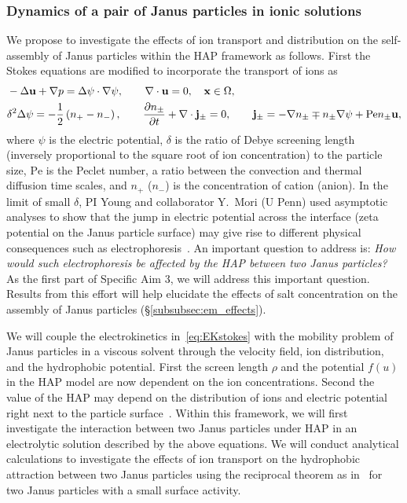 \subsubsection{Dynamics of a pair of Janus particles in ionic
solutions\label{subsubsec:JP_electrolyte}}
We propose to investigate the effects of ion transport and distribution
on the self-assembly of Janus particles within the HAP framework as
follows. First the Stokes equations are modified to incorporate the
transport of ions as
\begin{equation}
\label{eq:EKstokes}
\begin{aligned}
  &-\Delta \mathbf{u} + \nabla p = \Delta\psi\cdot\nabla\psi, \qquad
  \nabla \cdot \mathbf{u} = 0,  \quad \mathbf{x} \in \Omega,\\
  &\delta^2\Delta\psi = -\frac{1}{2}\left(n_+-n_-\right),\qquad
  \frac{\partial n_{\pm}}{\partial t} + \nabla\cdot{\bf j}_{\pm} = 0,\qquad {\bf j}_{\pm} = -\nabla n_{\pm} \mp n_{\pm} \nabla\psi + \mbox{Pe} n_{\pm}\mathbf{u},
\end{aligned}
\end{equation}
where $\psi$ is the electric potential, $\delta$ is the ratio of Debye
screening length (inversely proportional to the square root of ion
concentration) to the particle size, $\mbox{Pe}$ is the Peclet number, a
ratio between the convection and thermal diffusion time scales, and
$n_{+}$ ($n_{-}$) is the concentration of cation (anion). In the limit
of small $\delta$, PI Young and collaborator Y.~Mori (U Penn) used
asymptotic analyses to show that the jump in electric potential across
the interface (zeta potential on the Janus particle surface) may give
rise to different physical consequences such as
electrophoresis~\cite{Mori2018_JFM}.
%
An important question to address is: {\it How would such electrophoresis
be affected by the HAP between two Janus particles?} As the first part
of Specific Aim 3, we will address this important question. Results from
this effort will help elucidate the effects of salt concentration on the
assembly of Janus particles (\S\ref{subsubsec:em_effects}).

We will couple the electrokinetics in~\eqref{eq:EKstokes} with the
mobility problem of Janus particles in a viscous solvent through the
velocity field, ion distribution, and the hydrophobic potential. First
the screen length $\rho$ and the potential $f(u)$ in the HAP model are now 
dependent on  the ion concentrations. 
%
Second the value of the HAP may depend on the distribution of ions and
electric potential right next to the particle
surface~\cite{Mori2018_JFM}. Within this framework, we will first
investigate the interaction between two Janus particles under HAP in an
electrolytic solution described by the above equations. We will conduct
analytical calculations to investigate the effects of ion transport on
the hydrophobic attraction between two Janus particles using the
reciprocal theorem as in~\cite{BayatiNajafi2016_JCP} for two Janus
particles with a small surface activity.


